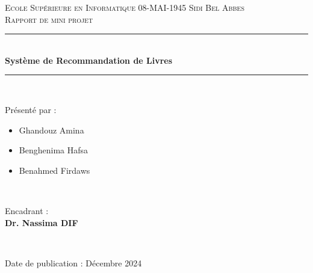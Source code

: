 \documentclass[a4paper, 12pt]{article}
\begin{document}

\vspace{1cm}
\begin{center}
\thispagestyle{empty}
    \textsc{\LARGE Ecole Supérieure en Informatique 08-MAI-1945 Sidi Bel Abbes}\\[1cm]
    
    \textsc{\Large Rapport de mini projet}\\[0.5cm]
    
    \rule{\linewidth}{0.5mm} \\[0.4cm]
    {\huge \bfseries Système de Recommandation de Livres}\\
    \rule{\linewidth}{0.5mm} \\[1.5cm]
    \vfill
\begin{minipage}{0.4\textwidth}
        \begin{flushleft} \large
            Présenté par :\\
            \begin{itemize}[label=\textbullet]
    \item  Ghandouz Amina
      \item  Benghenima Hafsa
      \item  Benahmed Firdaws
    
\end{itemize}
        \end{flushleft}
    \end{minipage}
    ~
\hspace{2.5cm}
    \begin{minipage}{0.4\textwidth}
        \begin{flushright} \large
             Encadrant :\\
            \textbf{ Dr. Nassima DIF}
        \end{flushright}
    \end{minipage}\\[2cm]
	\vfill
    
    {\large Date de publication : Décembre 2024}\\
\end{center}
\newpage
\setcounter{page}{1}
\newpage
\end{document}
